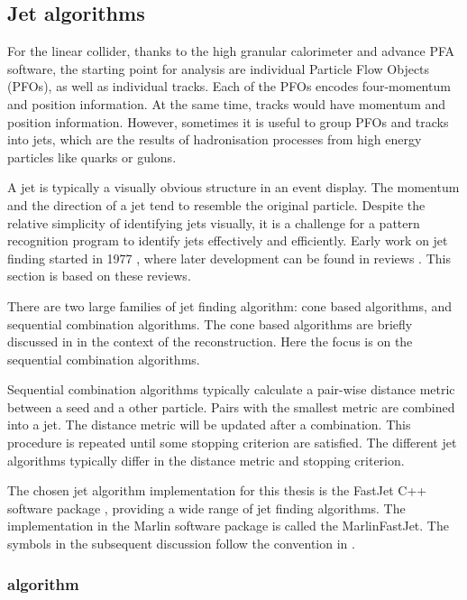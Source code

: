 \subsection{Jet algorithms}
\label{sec:pandoraJetAlg}

For the linear collider, thanks to the high granular calorimeter and advance PFA software, the starting point for analysis are individual Particle Flow Objects (PFOs), as well as individual tracks. Each of the PFOs encodes four-momentum and position information. At the same time, tracks would have momentum and position information. However, sometimes it is useful to group PFOs and tracks into jets, which are the results of hadronisation processes from high energy particles like quarks or gulons.

A jet is typically a visually obvious structure in an event display. The momentum and the direction of a jet tend to resemble the original particle. Despite the relative simplicity of identifying jets visually, it is a challenge for a pattern recognition program to identify jets effectively and efficiently. Early work on jet finding started in 1977 \cite{Sterman:1977wj}, where later development can be found in reviews \cite{Moretti:1998qx,Salam:2009jx,Ali:2010tw}. This section is based on these reviews.

There are two large families of jet finding algorithm: cone based algorithms, and sequential combination algorithms. The cone based algorithms are briefly discussed in  in the context of the \pandora reconstruction. Here the focus is on the sequential combination algorithms.

Sequential combination algorithms typically calculate a pair-wise distance metric between a seed and a other particle. Pairs with the smallest metric are combined into a jet. The distance metric will be updated after a combination. This procedure is repeated until some stopping criterion are satisfied. The different jet algorithms typically differ in the distance metric and stopping criterion.

The chosen jet algorithm implementation for this thesis is the FastJet C++ software package \cite{Cacciari:2011ma,Cacciari:2005hq}, providing a wide range of jet finding algorithms. The implementation in the Marlin software package is called the MarlinFastJet. The symbols in the subsequent discussion follow the convention in \cite{Cacciari:2011ma}.

\subsubsection{\kt algorithm}


